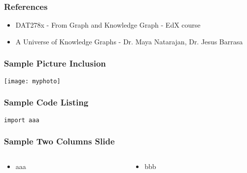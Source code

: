 \begin{frame}[fragile]\frametitle{References}

\begin{itemize}
\item DAT278x - From Graph and Knowledge Graph - EdX course
\item A Universe of Knowledge Graphs -  Dr. Maya Natarajan, Dr. Jesus Barrasa
\end{itemize}
	  
\end{frame}
















\begin{frame}[fragile]\frametitle{Sample Picture Inclusion}

\begin{center}
\texttt{[image: myphoto]}
\end{center}	  
\end{frame}

\begin{frame}[fragile] \frametitle{Sample Code Listing}
\begin{lstlisting}
import aaa
\end{lstlisting}

\end{frame}

\begin{frame}[fragile]\frametitle{Sample Two Columns Slide}
\begin{columns}
    \begin{column}[T]{0.6\linewidth}
      \begin{itemize}
		\item aaa
	  \end{itemize}

    \end{column}
    \begin{column}[T]{0.4\linewidth}
      \begin{itemize}
		\item bbb
	  \end{itemize}
    \end{column}
  \end{columns}
\end{frame}

